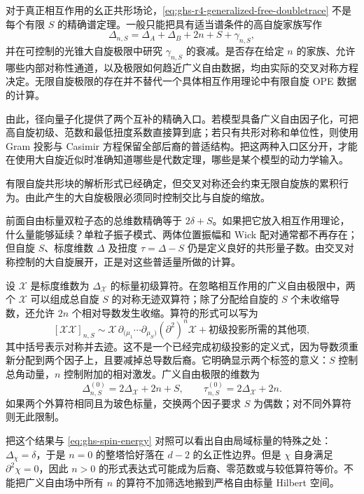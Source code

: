 对于真正相互作用的幺正共形场论，\cref{eq:ghs-r4-generalized-free-doubletrace} 不是每个有限 $S$ 的精确谱定理。一般只能把具有适当谱条件的高自旋家族写作
\begin{equation}\label{eq:ghs-r4-interacting-doubletwist}
 \Delta_{n,S}=\Delta_A+\Delta_B+2n+S+\gamma_{n,S},
\end{equation}
并在可控制的光锥大自旋极限中研究 $\gamma_{n,S}$ 的衰减。是否存在给定 $n$ 的家族、允许哪些内部对称性通道，以及极限如何趋近广义自由数据，均由实际的交叉对称方程决定。无限自旋极限的存在并不替代一个具体相互作用理论中有限自旋 OPE 数据的计算。

由此，径向量子化提供了两个互补的精确入口。若模型具备广义自由因子化，可把高自旋初级、范数和最低扭度系数直接算到底；若只有共形对称和单位性，则使用 Gram 投影与 Casimir 方程保留全部后裔的普适结构。把这两种入口区分开，才能在使用大自旋近似时准确知道哪些是代数定理，哪些是某个模型的动力学输入。


有限自旋共形块的解析形式已经确定，但交叉对称还会约束无限自旋族的累积行为。由此产生的大自旋极限必须同时控制交比与自旋的缩放。


前面自由标量双粒子态的总维数精确等于 $2\delta+S$。如果把它放入相互作用理论，什么量能够延续？单粒子振子模式、两体位置振幅和 Wick 配对通常都不再存在；但自旋 $S$、标度维数 $\Delta$ 及扭度 $\tau=\Delta-S$ 仍是定义良好的共形量子数。由交叉对称控制的大自旋展开，正是对这些普适量所做的计算。


设 $\mathcal X$ 是标度维数为 $\Delta_\mathcal X$ 的标量初级算符。在忽略相互作用的广义自由极限中，两个 $\mathcal X$ 可以组成总自旋 $S$ 的对称无迹双算符；除了分配给自旋的 $S$ 个未收缩导数，还允许 $2n$ 个相对导数发生收缩。算符的形式可以写为
\begin{equation}\label{eq:ghs-double-twist-operator}
 [\mathcal X\mathcal X]_{n,S}
 \sim\mathcal X\,\partial_{(\mu_1}\cdots\partial_{\mu_S)}(\partial^2)^n\mathcal X
 +\text{初级投影所需的其他项},
\end{equation}
其中括号表示对称并去迹。这不是一个已经完成初级投影的定义式，因为导数须重新分配到两个因子上，且要减掉总导数后裔。它明确显示两个标签的意义：$S$ 控制总角动量，$n$ 控制附加的相对激发。广义自由极限的维数为
\begin{equation}\label{eq:ghs-double-twist-tower}
 \Delta_{n,S}^{(0)}=2\Delta_\mathcal X+2n+S,
 \qquad \tau_{n,S}^{(0)}=2\Delta_\mathcal X+2n.
\end{equation}
如果两个外算符相同且为玻色标量，交换两个因子要求 $S$ 为偶数；对不同外算符则无此限制。

把这个结果与 \cref{eq:ghs-spin-energy} 对照可以看出自由局域标量的特殊之处：$\Delta_\chi=\delta$，于是 $n=0$ 的整塔恰好落在 $d-2$ 的幺正性边界。但是 $\chi$ 自身满足 $\partial^2\chi=0$，因此 $n>0$ 的形式表达式可能成为后裔、零范数或与较低算符等价。不能把广义自由场中所有 $n$ 的算符不加筛选地搬到严格自由标量 Hilbert 空间。


